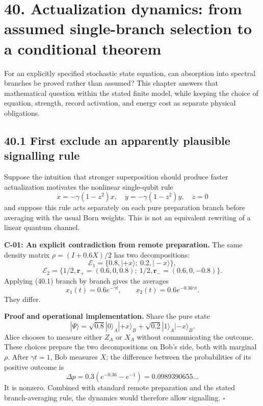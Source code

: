 \documentclass[
  11pt,
  oneside]{book}
\begin{document}
\chapter{40. Actualization dynamics: from assumed single-branch
selection to a conditional theorem}\label{ch-40}

For an explicitly specified stochastic state equation, can absorption
into spectral branches be proved rather than assumed? This chapter
answers that mathematical question within the stated finite model, while
keeping the choice of equation, strength, record activation, and energy
cost as separate physical obligations.

\section{40.1 First exclude an apparently plausible signalling rule}

Suppose the intuition that stronger superposition should produce faster
actualization motivates the nonlinear single-qubit rule \[
\dot x=-\gamma(1-z^2)x,\quad
\dot y=-\gamma(1-z^2)y,\quad \dot z=0
\tag{40.1}
\] and suppose this rule acts separately on each pure preparation branch
before averaging with the usual Born weights. This is not an equivalent
rewriting of a linear quantum channel.

\label{c-01}{}

\textbf{C-01: An explicit contradiction from remote preparation.} The
same density matrix \(\rho=(I+0.6X)/2\) has two decompositions: \[
\mathcal E_1=\{0.8,|+x\rangle;\ 0.2,|-x\rangle\},
\] \[
\mathcal E_2=\{1/2,\mathbf r_+=(0.6,0,0.8);\
1/2,\mathbf r_-=(0.6,0,-0.8)\}.
\] Applying (40.1) branch by branch gives the averages \[
x_1(t)=0.6e^{-\gamma t},\qquad
x_2(t)=0.6e^{-0.36\gamma t}.
\tag{40.2}
\] They differ.

\textbf{Proof and operational implementation.} Share the pure state \[
|\Psi\rangle=\sqrt{0.8}|0\rangle_A|+x\rangle_B
+\sqrt{0.2}|1\rangle_A|-x\rangle_B.
\] Alice chooses to measure either \(Z_A\) or \(X_A\) without
communicating the outcome. These choices prepare the two decompositions
on Bob's side, both with marginal \(\rho\). After \(\gamma t=1\), Bob
measures \(X\); the difference between the probabilities of its positive
outcome is \[
\Delta p=0.3(e^{-0.36}-e^{-1})=0.0989390655\ldots
\] It is nonzero. Combined with standard remote preparation and the
stated branch-averaging rule, the dynamics would therefore allow
signalling. \(\square\)
\end{document}
